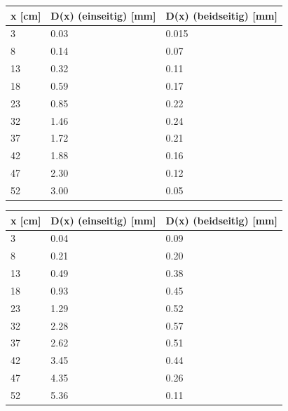 \begin{minipage}{\linewidth}
    \begin{table}[H]
        \centering
    \begin{tabular}{lll}
        \toprule
        x [cm] & D(x) (einseitig) [mm] & D(x) (beidseitig) [mm] \\
        \midrule
        3  & 0.03 & 0.015 \\
        8  & 0.14 & 0.07  \\
        13 & 0.32 & 0.11  \\
        18 & 0.59 & 0.17  \\
        23 & 0.85 & 0.22  \\
        32 & 1.46 & 0.24  \\
        37 & 1.72 & 0.21  \\
        42 & 1.88 & 0.16  \\
        47 & 2.30 & 0.12  \\
        52 & 3.00 & 0.05  \\
        \bottomrule   
    \end{tabular}
    
    \label{tab:1}
\end{table}
\end{minipage}


\begin{minipage}{\linewidth}
    \begin{table}[H]
        \centering
    \begin{tabular}{lll}
        \toprule
        x [cm] & D(x) (einseitig) [mm] & D(x) (beidseitig) [mm] \\
        \midrule
        3  & 0.04 & 0.09 \\
        8  & 0.21 & 0.20 \\
        13 & 0.49 & 0.38 \\
        18 & 0.93 & 0.45 \\
        23 & 1.29 & 0.52 \\
        32 & 2.28 & 0.57 \\
        37 & 2.62 & 0.51 \\
        42 & 3.45 & 0.44 \\
        47 & 4.35 & 0.26 \\
        52 & 5.36 & 0.11 \\
        \bottomrule   
    \end{tabular}
    
    \label{tab:2}
\end{table}
\end{minipage}

